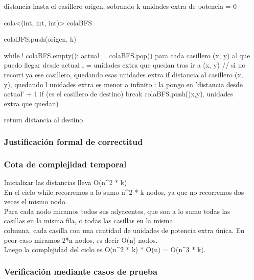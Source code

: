 \documentclass[11pt, a4paper, twoside]{article}
\begin{document}
distancia hasta el casillero origen, sobrando k unidades extra de potencia = 0

cola<(int, int, int)> colaBFS

colaBFS.push(origen, k)

while ! colaBFS.empty():
    actual = colaBFS.pop()
    para cada casillero (x, y) al que puedo llegar desde actual
        l = unidades extra que quedan tras ir a (x, y)
        // si no recorri ya ese casillero, quedando esas unidades extra
        if distancia al casillero (x, y), quedando l unidades extra es menor a infinito :
            la pongo en 'distancia desde actual' + 1
            if (es el casillero de destino) break
            colaBFS.push((x,y), unidades extra que quedan)

return distancia al destino




\subsubsection{Justificación formal de correctitud}

\subsubsection{Cota de complejidad temporal}
Inicializar las distancias lleva O(n^2 * k)\\
En el ciclo while recorremos a lo sumo n^2 * k nodos, ya que no recorremos dos veces el mismo nodo.\\
Para cada nodo miramos todos sus adyacentes, que son a lo sumo todas las casillas en la misma fila, o todas las casillas en la misma\\
columna, cada casilla con una cantidad de unidades de potencia extra única. En peor caso miramos 2*n nodos, es decir O(n) nodos.\\
Luego la complejidad del ciclo es O(n^2 * k) * O(n) = O(n^3 * k).\\





\subsubsection{Verificación mediante casos de prueba}
\end{document}
